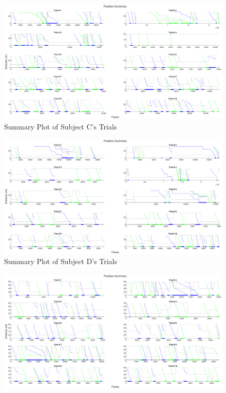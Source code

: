 \begin{appendices}
\begin{figure}[H]
    \includegraphics[width=\linewidth, height=\plotHeight\linewidth]{figures/subject_c_summary.eps}
    \caption{Summary Plot of Subject C's Trials}
    \label{fig:SumC}
\end{figure}
\begin{figure}[H]
    \centering
    \includegraphics[width=\linewidth, height=\plotHeight\linewidth]{figures/subject_d_summary.eps}
    \caption{Summary Plot of Subject D's Trials}
    \label{fig:SumD}
\end{figure}
\begin{figure}[H]
    \centering
    \includegraphics[width=\linewidth, height=\plotHeight\linewidth]{figures/subject_e_summary.eps}

\end{figure}
\end{appendices}
